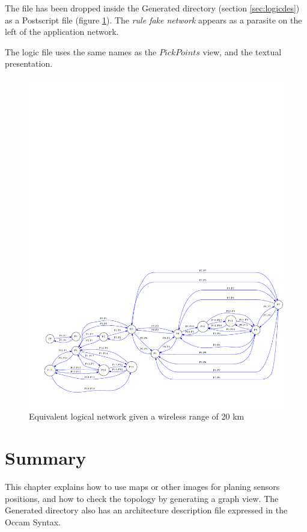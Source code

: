 \documentclass[times,a4paper]{book}
\begin{document}
The file has been dropped inside the Generated directory (section \ref{sec:logicdes})
as a Postscript file (figure \ref{fig:mekong1Logic}).
The {\sl rule fake network} appears as a parasite on the left
of the application network.

The logic file uses the same names as the $Pick Points$ view, and the textual presentation.

\begin{figure}[hbtp]
\begin{center} 
\includegraphics[width=12cm]{mekong1Logic.pdf}
\caption{Equivalent  logical network given a wireless range of 20 km
}
\label{fig:mekong1Logic}
\end{center}
\end{figure}



\section{Summary}

This chapter explains how to use maps or other images for planing sensors
positions, and how to check the topology by generating a graph view.
The Generated directory also has an architecture description file 
expressed in the Occam Syntax.
\end{document}
